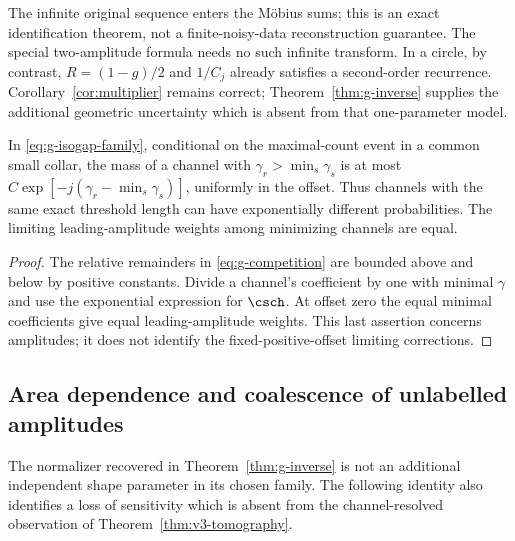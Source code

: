 The infinite original sequence enters the M\"obius sums; this is an exact
identification theorem, not a finite-noisy-data reconstruction guarantee.
The special two-amplitude formula needs no such infinite transform.
In a circle, by contrast, $R=(1-g)/2$ and $1/C_j$ already satisfies a
second-order recurrence. Corollary~\ref{cor:multiplier} remains correct;
Theorem~\ref{thm:g-inverse} supplies the additional geometric uncertainty
which is absent from that one-parameter model.

\begin{corollary}
\label{cor:g-selection}
In \eqref{eq:g-isogap-family}, conditional on the maximal-count event
in a common small collar, the mass of a channel with
$\gamma_r>\min_s\gamma_s$ is at most
$C\exp[-j(\gamma_r-\min_s\gamma_s)]$, uniformly in the offset.
Thus channels with the same exact threshold length can have exponentially
different probabilities. The limiting leading-amplitude weights among
minimizing channels are equal.
\end{corollary}
\begin{proof}
The relative remainders in \eqref{eq:g-competition} are bounded above
and below by positive constants. Divide a channel's coefficient by
one with minimal $\gamma$ and use the exponential expression for
$\csch$. At offset zero the equal minimal coefficients give equal
leading-amplitude weights. This last assertion concerns amplitudes;
it does not identify the fixed-positive-offset limiting corrections.
\end{proof}


\subsection{Area dependence and coalescence of unlabelled amplitudes}
\label{sec:v3-amplitude-data}
The normalizer recovered in Theorem~\ref{thm:g-inverse} is not an
additional independent shape parameter in its chosen family. The
following identity also identifies a loss of sensitivity which is
absent from the channel-resolved observation of
Theorem~\ref{thm:v3-tomography}.

